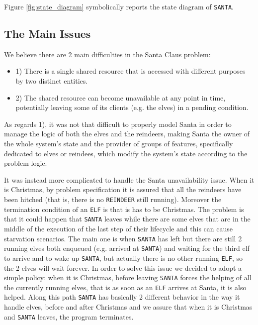 Figure \ref{fig:state_diagram} symbolically reports the state diagram of \texttt{SANTA}.


\subsection{The Main Issues}

We believe there are 2 main difficulties in the Santa Claus problem:

\begin{itemize}
	\item 1) There is a single shared resource that is accessed with different purposes by two distinct entities.
	\item 2) The shared resource can become unavailable at any point in time, potentially leaving some of its clients (e.g. the elves) in a pending condition.
\end{itemize}

As regards 1), it was not that difficult to properly model Santa in order to manage the logic of both the elves and the reindeers, making Santa the owner of the whole system's state and the provider of groups of features, specifically dedicated to elves or reindees, which modify the system's state according to the problem logic.

It was instead more complicated to handle the Santa unavailability issue. When it is Christmas, by problem specification it is assured that all the reindeers have been hitched (that is, there is no \texttt{REINDEER} still running). Moreover the termination condition of an \texttt{ELF} is that is has to be Christmas. The problem is that it could happen that \texttt{SANTA} leaves while there are some elves that are in the middle of the execution of the last step of their lifecycle and this can cause starvation scenarios. The main one is when \texttt{SANTA} has left but there are still 2 running elves both enqueued (e.g. arrived at \texttt{SANTA}) and waiting for the third elf to arrive and to wake up \texttt{SANTA}, but actually there is no other running \texttt{ELF}, so the 2 elves will wait forever. 
In order to solve this issue we decided to adopt a simple policy: when it is Christmas, before leaving \texttt{SANTA} forces the helping of all the currently running elves, that is as soon as an \texttt{ELF} arrives at Santa, it is also helped. Along this path \texttt{SANTA} has basically 2 different behavior in the way it handle elves, before and after Christmas and we assure that when it is Christmas and \texttt{SANTA} leaves, the program terminates.

